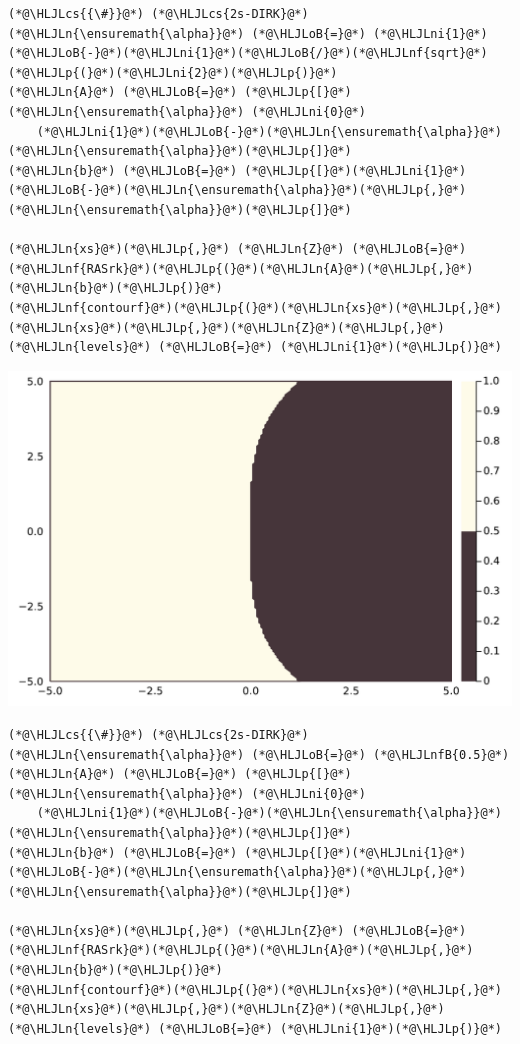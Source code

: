 \documentclass[12pt,a4paper]{article}
\newcommand{\HLJLn}[1]{#1}
\newcommand{\HLJLnf}[1]{\textcolor[RGB]{66,102,213}{#1}}
\newcommand{\HLJLnfB}[1]{\textcolor[RGB]{59,151,46}{#1}}
\newcommand{\HLJLni}[1]{\textcolor[RGB]{59,151,46}{#1}}
\newcommand{\HLJLoB}[1]{\textcolor[RGB]{102,102,102}{\textbf{#1}}}
\newcommand{\HLJLp}[1]{#1}
\newcommand{\HLJLcs}[1]{\textcolor[RGB]{153,153,119}{\textit{#1}}}
\begin{document}
\begin{lstlisting}
(*@\HLJLcs{{\#}}@*) (*@\HLJLcs{2s-DIRK}@*)
(*@\HLJLn{\ensuremath{\alpha}}@*) (*@\HLJLoB{=}@*) (*@\HLJLni{1}@*)(*@\HLJLoB{-}@*)(*@\HLJLni{1}@*)(*@\HLJLoB{/}@*)(*@\HLJLnf{sqrt}@*)(*@\HLJLp{(}@*)(*@\HLJLni{2}@*)(*@\HLJLp{)}@*)
(*@\HLJLn{A}@*) (*@\HLJLoB{=}@*) (*@\HLJLp{[}@*)(*@\HLJLn{\ensuremath{\alpha}}@*) (*@\HLJLni{0}@*)
    (*@\HLJLni{1}@*)(*@\HLJLoB{-}@*)(*@\HLJLn{\ensuremath{\alpha}}@*) (*@\HLJLn{\ensuremath{\alpha}}@*)(*@\HLJLp{]}@*)
(*@\HLJLn{b}@*) (*@\HLJLoB{=}@*) (*@\HLJLp{[}@*)(*@\HLJLni{1}@*)(*@\HLJLoB{-}@*)(*@\HLJLn{\ensuremath{\alpha}}@*)(*@\HLJLp{,}@*) (*@\HLJLn{\ensuremath{\alpha}}@*)(*@\HLJLp{]}@*)

(*@\HLJLn{xs}@*)(*@\HLJLp{,}@*) (*@\HLJLn{Z}@*) (*@\HLJLoB{=}@*) (*@\HLJLnf{RASrk}@*)(*@\HLJLp{(}@*)(*@\HLJLn{A}@*)(*@\HLJLp{,}@*)(*@\HLJLn{b}@*)(*@\HLJLp{)}@*)
(*@\HLJLnf{contourf}@*)(*@\HLJLp{(}@*)(*@\HLJLn{xs}@*)(*@\HLJLp{,}@*)(*@\HLJLn{xs}@*)(*@\HLJLp{,}@*)(*@\HLJLn{Z}@*)(*@\HLJLp{,}@*) (*@\HLJLn{levels}@*) (*@\HLJLoB{=}@*) (*@\HLJLni{1}@*)(*@\HLJLp{)}@*)
\end{lstlisting}

\includegraphics[width=\linewidth]{figures/ass_3_report_4_1.pdf}

\begin{lstlisting}
(*@\HLJLcs{{\#}}@*) (*@\HLJLcs{2s-DIRK}@*)
(*@\HLJLn{\ensuremath{\alpha}}@*) (*@\HLJLoB{=}@*) (*@\HLJLnfB{0.5}@*)
(*@\HLJLn{A}@*) (*@\HLJLoB{=}@*) (*@\HLJLp{[}@*)(*@\HLJLn{\ensuremath{\alpha}}@*) (*@\HLJLni{0}@*)
    (*@\HLJLni{1}@*)(*@\HLJLoB{-}@*)(*@\HLJLn{\ensuremath{\alpha}}@*) (*@\HLJLn{\ensuremath{\alpha}}@*)(*@\HLJLp{]}@*)
(*@\HLJLn{b}@*) (*@\HLJLoB{=}@*) (*@\HLJLp{[}@*)(*@\HLJLni{1}@*)(*@\HLJLoB{-}@*)(*@\HLJLn{\ensuremath{\alpha}}@*)(*@\HLJLp{,}@*) (*@\HLJLn{\ensuremath{\alpha}}@*)(*@\HLJLp{]}@*)

(*@\HLJLn{xs}@*)(*@\HLJLp{,}@*) (*@\HLJLn{Z}@*) (*@\HLJLoB{=}@*) (*@\HLJLnf{RASrk}@*)(*@\HLJLp{(}@*)(*@\HLJLn{A}@*)(*@\HLJLp{,}@*)(*@\HLJLn{b}@*)(*@\HLJLp{)}@*)
(*@\HLJLnf{contourf}@*)(*@\HLJLp{(}@*)(*@\HLJLn{xs}@*)(*@\HLJLp{,}@*)(*@\HLJLn{xs}@*)(*@\HLJLp{,}@*)(*@\HLJLn{Z}@*)(*@\HLJLp{,}@*) (*@\HLJLn{levels}@*) (*@\HLJLoB{=}@*) (*@\HLJLni{1}@*)(*@\HLJLp{)}@*)
\end{lstlisting}
\end{document}
